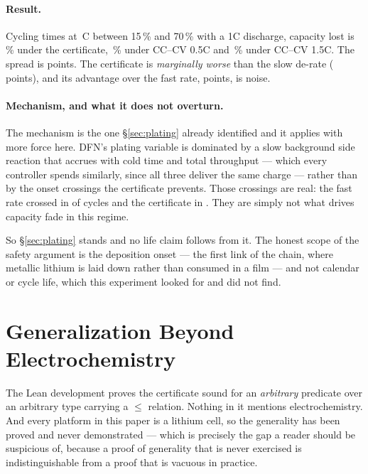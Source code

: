 \documentclass[11pt,letterpaper]{article}
\theoremstyle{definition}
\theoremstyle{remark}
\newcommand{\SI}[2]{#1\,#2}
\newcommand{\degreeCelsius}{\degC}
\newcommand{\degC}{\ifmmode{^\circ}\mathrm{C}\else\textdegree C\fi}
\begin{document}
\paragraph{Result.} Cycling \clCycles{} times at \SI{\clAmb}{\degreeCelsius} between 15\,\% and 70\,\%
with a 1C discharge, capacity lost is \clCertFade\,\% under the certificate, \clSlowFade\,\%
under CC--CV 0.5C and \clFastFade\,\% under CC--CV 1.5C. The spread is \clSpread{} points. The
certificate is \emph{marginally worse} than the slow de-rate (\clVsSafe{} points), and its
advantage over the fast rate, \clVsFast{} points, is noise.

\paragraph{Mechanism, and what it does not overturn.} The mechanism is the one \S\ref{sec:plating}
already identified and it applies with more force here. DFN's plating variable is dominated by a
slow background side reaction that accrues with cold time and total throughput --- which every
controller spends similarly, since all three deliver the same charge --- rather than by the
onset crossings the certificate prevents. Those crossings are real: the fast rate crossed in
\clFastOnset{} of \clCycles{} cycles and the certificate in \clCertOnset. They are simply not
what drives capacity fade in this regime.

So \S\ref{sec:plating} stands and no life claim follows from it. The honest scope of the safety
argument is the deposition onset --- the first link of the chain, where metallic lithium is laid
down rather than consumed in a film --- and not calendar or cycle life, which this experiment
looked for and did not find.



\section{Generalization Beyond Electrochemistry}\label{sec:motor}

The Lean development proves the certificate sound for an \emph{arbitrary} predicate over an
arbitrary type carrying a $\le$ relation. Nothing in it mentions electrochemistry. And every
platform in this paper is a lithium cell, so the generality has been proved and never
demonstrated --- which is precisely the gap a reader should be suspicious of, because a proof
of generality that is never exercised is indistinguishable from a proof that is vacuous in
practice.
\end{document}
